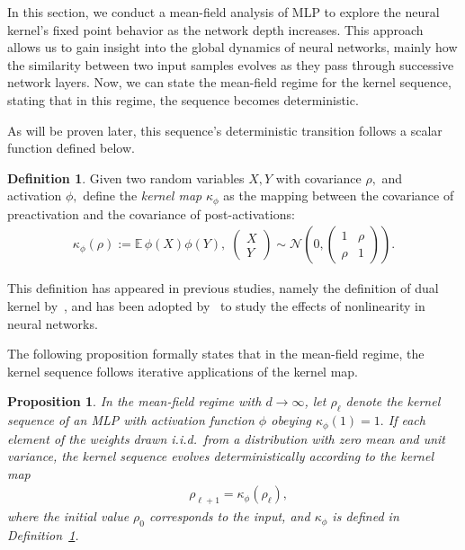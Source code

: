 \documentclass[twoside]{article}
\newcommand{\km}{\kappa_\phi}
\newcommand{\E}{\mathbb{E}\,}
\newtheorem{proposition}{Proposition}
\theoremstyle{definition}
\newtheorem{definition}{Definition}
\begin{document}
In this section, we conduct a mean-field analysis of MLP to explore the neural kernel's fixed point behavior as the network depth increases. This approach allows us to gain insight into the global dynamics of neural networks, mainly how the similarity between two input samples evolves as they pass through successive network layers.
Now, we can state the mean-field regime for the kernel sequence, stating that in this regime, the sequence becomes deterministic. 

As will be proven later, this sequence's deterministic transition follows a scalar function defined below. 

\begin{definition}
    \label{def:kernel_map}
Given two random variables $X, Y$ with covariance $\rho,$ and activation $\phi,$ define the \emph{kernel map } $\km$ as the mapping between the covariance of preactivation and the covariance of post-activations:
\begin{align}
 \km(\rho):=\E\phi(X)\phi(Y), \; 
 \begin{pmatrix}X \\ Y\end{pmatrix}\sim \mathcal N\left(0, \begin{pmatrix} 1 & \rho \\ \rho & 1 \end{pmatrix}
 \right).
 \label{eq:kernel_map}
\end{align}
\end{definition}

This definition has appeared in previous studies, namely the definition of dual kernel by~\citet{daniely2016toward}, and has been adopted by~\citet{joudaki2023impact} to study the effects of nonlinearity in neural networks. 

The following proposition formally states that in the mean-field regime, the kernel sequence follows iterative applications of the kernel map. 

\begin{proposition}
\label{prop:mean_field_kernel_general}
In the mean-field regime with ${d \to \infty}$, let $\rho_\ell$ denote the kernel sequence of an MLP with activation function $\phi$ obeying $\km(1)= 1.$ If each element of the weights drawn i.i.d.~from a distribution with zero mean and unit variance, the kernel sequence evolves deterministically according to the kernel map
\begin{align*}
&\rho_{\ell+1} = \km(\rho_\ell),
\end{align*}
where the initial value $\rho_0$ corresponds to the input, and $\km$ is defined in Definition~\ref{def:kernel_map}. 


\end{proposition}
\end{document}
